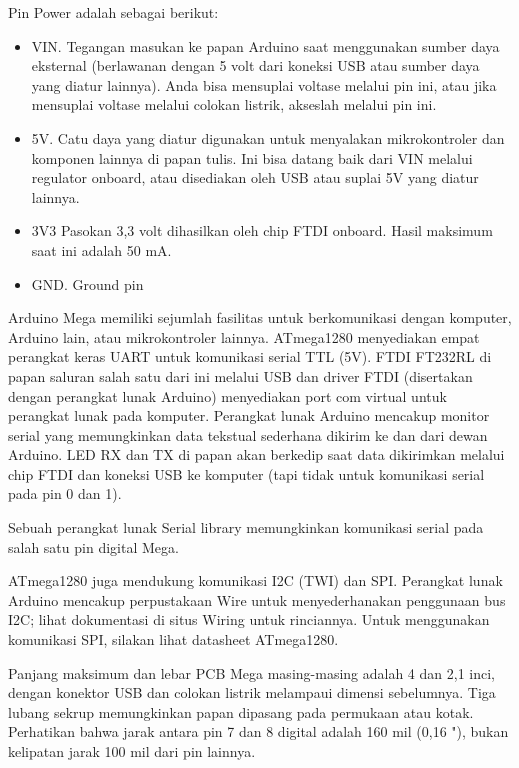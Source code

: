 Pin Power adalah sebagai berikut:
\begin{itemize}
\item VIN. Tegangan masukan ke papan Arduino saat menggunakan sumber daya eksternal (berlawanan dengan 5 volt dari koneksi USB atau sumber daya yang diatur lainnya). Anda bisa mensuplai voltase melalui pin ini, atau jika mensuplai voltase melalui colokan listrik, akseslah melalui pin ini.
\item 5V. Catu daya yang diatur digunakan untuk menyalakan mikrokontroler dan komponen lainnya di papan tulis. Ini bisa datang baik dari VIN melalui regulator onboard, atau disediakan oleh USB atau suplai 5V yang diatur lainnya.
\item 3V3 Pasokan 3,3 volt dihasilkan oleh chip FTDI onboard. Hasil maksimum saat ini adalah 50 mA.
\item GND. Ground pin
\end{itemize}


Arduino Mega memiliki sejumlah fasilitas untuk berkomunikasi dengan komputer, Arduino lain, atau mikrokontroler lainnya. ATmega1280 menyediakan empat perangkat keras UART untuk komunikasi serial TTL (5V). FTDI FT232RL di papan saluran salah satu dari ini melalui USB dan driver FTDI (disertakan dengan perangkat lunak Arduino) menyediakan port com virtual untuk perangkat lunak pada komputer. Perangkat lunak Arduino mencakup monitor serial yang memungkinkan data tekstual sederhana dikirim ke dan dari dewan Arduino. LED RX dan TX di papan akan berkedip saat data dikirimkan melalui chip FTDI dan koneksi USB ke komputer (tapi tidak untuk komunikasi serial pada pin 0 dan 1).

Sebuah perangkat lunak Serial library memungkinkan komunikasi serial pada salah satu pin digital Mega.

ATmega1280 juga mendukung komunikasi I2C (TWI) dan SPI. Perangkat lunak Arduino mencakup perpustakaan Wire untuk menyederhanakan penggunaan bus I2C; lihat dokumentasi di situs Wiring untuk rinciannya. Untuk menggunakan komunikasi SPI, silakan lihat datasheet ATmega1280.

Panjang maksimum dan lebar PCB Mega masing-masing adalah 4 dan 2,1 inci, dengan konektor USB dan colokan listrik melampaui dimensi sebelumnya. Tiga lubang sekrup memungkinkan papan dipasang pada permukaan atau kotak. Perhatikan bahwa jarak antara pin 7 dan 8 digital adalah 160 mil (0,16 "), bukan kelipatan jarak 100 mil dari pin lainnya.

